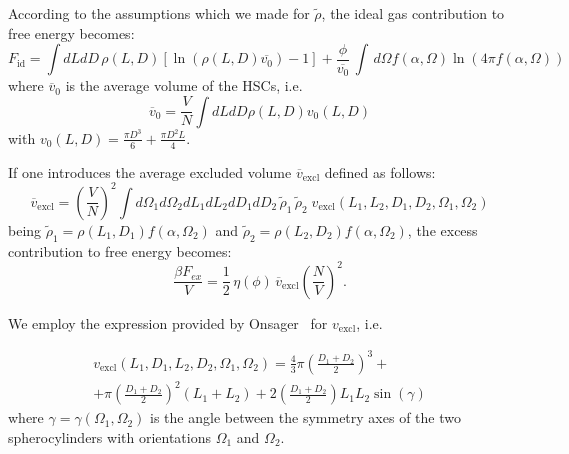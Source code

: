 \documentclass[journal=jacsat,manuscript=article]{achemso}
\begin{document}
According to the assumptions which we made for $\tilde\rho$, the ideal gas contribution to free energy becomes:
\begin{equation}
  F_\mathrm{id} = \int dL dD\,\rho(L,D) \left[\ln(\rho(L,D)\overline{v_0}) - 1\right ] + \frac{\phi}{\overline{v_0}} \, 
  \int \, d\Omega f(\alpha,\Omega) \ln(4 \pi f(\alpha,\Omega))
\end{equation}
where $\overline{v}_0$ is the average volume of the HSCs, i.e.
\begin{equation}
\overline{v}_0 = \frac{V}{N} \int dL dD \rho(L,D) v_0(L, D)
\end{equation}
with $v_0(L, D) = \frac{\pi D^3}{6} + \frac{\pi D^2 L}{4}$.

If one introduces the average excluded volume $\overline{v}_\mathrm{excl}$ defined as follows:
\begin{equation}\label{eq:vex}
\overline{v}_\mathrm{excl} = \left(\frac{V}{N}\right)^2 \int d\Omega_1 d\Omega_2 dL_1 dL_2 dD_1 dD_2\, \tilde\rho_1\, \tilde\rho_2\; v_\mathrm{excl}(L_1, L_2, D_1, D_2, \Omega_1, \Omega_2) 
 \end{equation}
being $\tilde\rho_1=\rho(L_1,D_1) f(\alpha,\Omega_2)$ and $\tilde\rho_2=\rho(L_2, D_2) f(\alpha,\Omega_2)$,
the excess contribution to free energy becomes: 
 \begin{equation}\label{eq:Fex}
   \frac{\beta F_{ex}}{V} = \frac{1}{2} \, \eta(\phi) \, \overline{v}_\mathrm{excl} \left(\frac{N}{V}\right)^2.
 \end{equation}


We employ the expression provided by Onsager~\cite{onsager1949effects} for $v_\mathrm{excl}$, i.e.

\begin{multline} \label{eq:vexcl}
	v_\mathrm{excl}(L_1, D_1, L_2, D_2, \Omega_1, \Omega_2) = \frac{4}{3} \pi \left(\frac{D_1 + D_2}{2}\right)^3 + \\ + \pi \left(\frac{D_1 + D_2}{2}\right)^2 (L_1 + L_2) + 2 \left( \frac{D_1 + D_2}{2} \right) L_1 L_2 \sin(\gamma)
\end{multline}
where $\gamma=\gamma(\Omega_1,\Omega_2)$ is the angle between the symmetry axes of the two spherocylinders with orientations $\Omega_1$ and $\Omega_2$.
\end{document}
